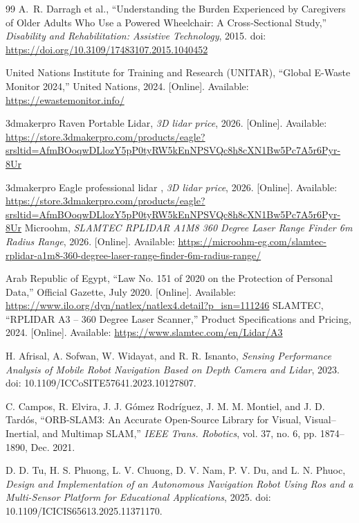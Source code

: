 \documentclass[12pt,a4paper]{report}
\begin{document}
\begin{singlespace}
\begin{thebibliography}{99}
A.~R. Darragh et al., ``Understanding the Burden Experienced by Caregivers
of Older Adults Who Use a Powered Wheelchair: A Cross-Sectional Study,''
\textit{Disability and Rehabilitation: Assistive Technology}, 2015.
doi: \url{https://doi.org/10.3109/17483107.2015.1040452}

United Nations Institute for Training and Research (UNITAR), ``Global
E-Waste Monitor 2024,'' United Nations, 2024. [Online]. Available:
\url{https://ewastemonitor.info/}


3dmakerpro Raven Portable Lidar,
\textit{3D lidar price},
2026. [Online]. Available: \url{https://store.3dmakerpro.com/products/eagle?srsltid=AfmBOoqwDLlozY5pP0tyRW5kEnNPSVQc8h8cXN1Bw5Pc7A5r6Pyr-8Ur}

3dmakerpro Eagle professional lidar ,
\textit{3D lidar price},
2026. [Online]. Available: \url{https://store.3dmakerpro.com/products/eagle?srsltid=AfmBOoqwDLlozY5pP0tyRW5kEnNPSVQc8h8cXN1Bw5Pc7A5r6Pyr-8Ur}
Microohm,
\textit{SLAMTEC RPLIDAR A1M8 360 Degree Laser Range Finder 6m Radius Range},
2026. [Online]. Available: \url{https://microohm-eg.com/slamtec-rplidar-a1m8-360-degree-laser-range-finder-6m-radius-range/}


Arab Republic of Egypt, ``Law No. 151 of 2020 on the Protection of Personal Data,'' Official Gazette, July 2020. [Online]. Available: \url{https://www.ilo.org/dyn/natlex/natlex4.detail?p_isn=111246}
SLAMTEC, ``RPLIDAR A3 -- 360 Degree Laser Scanner,'' Product Specifications and Pricing, 2024. [Online]. Available: \url{https://www.slamtec.com/en/Lidar/A3}



H. Afrisal, A. Sofwan, W. Widayat, and R. R. Isnanto,
\textit{Sensing Performance Analysis of Mobile Robot Navigation Based on Depth Camera and Lidar},
2023. doi: 10.1109/ICCoSITE57641.2023.10127807.

C. Campos, R. Elvira, J. J. G{\'o}mez Rodr{\'i}guez, J. M. M. Montiel, and J. D. Tard{\'o}s, ``ORB-SLAM3: An Accurate Open-Source Library for Visual, Visual--Inertial, and Multimap SLAM,'' \textit{IEEE Trans. Robotics}, vol. 37, no. 6, pp. 1874--1890, Dec. 2021.

D. D. Tu, H. S. Phuong, L. V. Chuong, D. V. Nam, P. V. Du, and L. N. Phuoc,
\textit{Design and Implementation of an Autonomous Navigation Robot Using Ros and a Multi-Sensor Platform for Educational Applications},
2025. doi: 10.1109/ICICIS65613.2025.11371170.


\end{thebibliography}
\end{singlespace}
\end{document}
